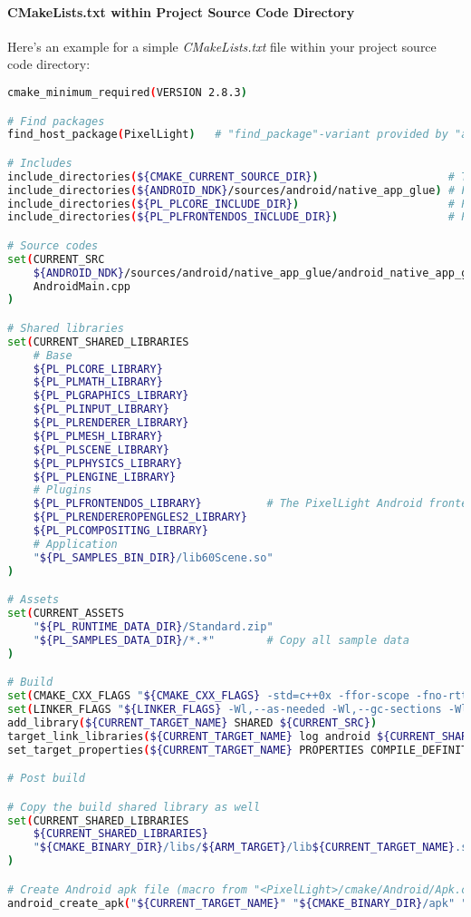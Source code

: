 \paragraph{CMakeLists.txt within Project Source Code Directory}
Here's an example for a simple \emph{CMakeLists.txt} file within your project source code directory:
\begin{lstlisting}[language=sh]
cmake_minimum_required(VERSION 2.8.3)

# Find packages
find_host_package(PixelLight)	# "find_package"-variant provided by "android.toolchain.cmake", required for PixelLight CMake variables like "PL_PLCORE_INCLUDE_DIR"

# Includes
include_directories(${CMAKE_CURRENT_SOURCE_DIR})					# The current source directory
include_directories(${ANDROID_NDK}/sources/android/native_app_glue)	# For the "android_native_app_glue.h"-header include
include_directories(${PL_PLCORE_INCLUDE_DIR})						# PLCore headers
include_directories(${PL_PLFRONTENDOS_INCLUDE_DIR})					# PLFrontendOS headers

# Source codes
set(CURRENT_SRC
	${ANDROID_NDK}/sources/android/native_app_glue/android_native_app_glue.c
	AndroidMain.cpp
)

# Shared libraries
set(CURRENT_SHARED_LIBRARIES
	# Base
	${PL_PLCORE_LIBRARY}
	${PL_PLMATH_LIBRARY}
	${PL_PLGRAPHICS_LIBRARY}
	${PL_PLINPUT_LIBRARY}
	${PL_PLRENDERER_LIBRARY}
	${PL_PLMESH_LIBRARY}
	${PL_PLSCENE_LIBRARY}
	${PL_PLPHYSICS_LIBRARY}
	${PL_PLENGINE_LIBRARY}
	# Plugins
	${PL_PLFRONTENDOS_LIBRARY}			# The PixelLight Android frontend
	${PL_PLRENDEREROPENGLES2_LIBRARY}
	${PL_PLCOMPOSITING_LIBRARY}
	# Application
	"${PL_SAMPLES_BIN_DIR}/lib60Scene.so"
)

# Assets
set(CURRENT_ASSETS
	"${PL_RUNTIME_DATA_DIR}/Standard.zip"
	"${PL_SAMPLES_DATA_DIR}/*.*"		# Copy all sample data
)

# Build
set(CMAKE_CXX_FLAGS "${CMAKE_CXX_FLAGS} -std=c++0x -ffor-scope -fno-rtti -fno-exceptions -pipe -ffunction-sections -fdata-sections -ffast-math -Wnon-virtual-dtor -Wreorder -Wsign-promo -fvisibility=hidden -fvisibility-inlines-hidden -Wstrict-null-sentinel -Os -funroll-all-loops -fpeel-loops -ftree-vectorize")
set(LINKER_FLAGS "${LINKER_FLAGS} -Wl,--as-needed -Wl,--gc-sections -Wl,--no-undefined -Wl,--strip-all -Wl,-rpath-link=${ANDROID_NDK_SYSROOT}/usr/lib/ -L${ANDROID_NDK_SYSROOT}/usr/lib/")
add_library(${CURRENT_TARGET_NAME} SHARED ${CURRENT_SRC})
target_link_libraries(${CURRENT_TARGET_NAME} log android ${CURRENT_SHARED_LIBRARIES})
set_target_properties(${CURRENT_TARGET_NAME} PROPERTIES COMPILE_DEFINITIONS "__STDC_INT64__;LINUX;ANDROID")	# PLCore needs the preprocessor definitions "LINUX" and "ANDROID"

# Post build

# Copy the build shared library as well
set(CURRENT_SHARED_LIBRARIES
	${CURRENT_SHARED_LIBRARIES}
	"${CMAKE_BINARY_DIR}/libs/${ARM_TARGET}/lib${CURRENT_TARGET_NAME}.so"
)

# Create Android apk file (macro from "<PixelLight>/cmake/Android/Apk.cmake")
android_create_apk("${CURRENT_TARGET_NAME}" "${CMAKE_BINARY_DIR}/apk" "${CURRENT_SHARED_LIBRARIES}" "${CURRENT_ASSETS}" "Data")
\end{lstlisting}


